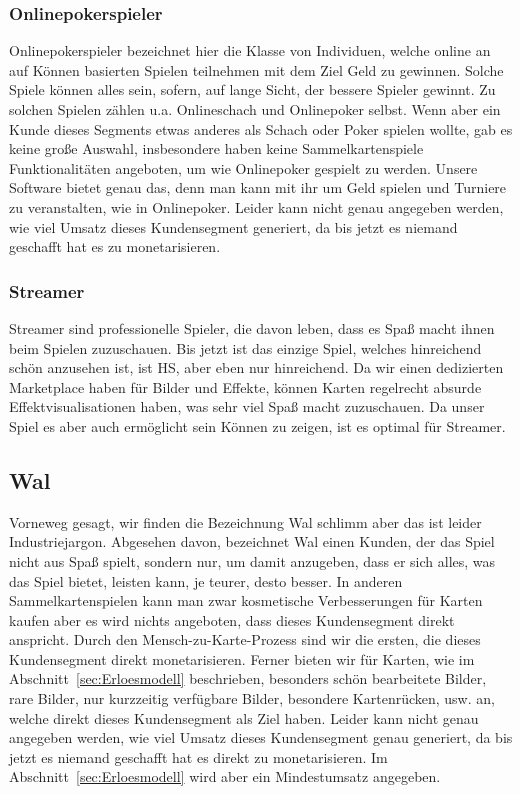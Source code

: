\documentclass[fontsize=12, a4aper]{scrartcl}
\begin{document}
\subsubsection{Onlinepokerspieler} \label{subsubsec:Professioneller_Spieler_Onlinepokerspieler}

Onlinepokerspieler bezeichnet hier die Klasse von Individuen, welche online an auf Können basierten Spielen teilnehmen mit dem Ziel Geld zu gewinnen. Solche Spiele können alles sein, sofern, auf lange Sicht, der bessere Spieler gewinnt. Zu solchen Spielen zählen u.a. Onlineschach und Onlinepoker selbst. Wenn aber ein Kunde dieses Segments etwas anderes als Schach oder Poker spielen wollte, gab es keine große Auswahl, insbesondere haben keine Sammelkartenspiele Funktionalitäten angeboten, um wie Onlinepoker gespielt zu werden. Unsere Software bietet genau das, denn man kann mit ihr um Geld spielen und Turniere zu veranstalten, wie in Onlinepoker. Leider kann nicht genau angegeben werden, wie viel Umsatz dieses Kundensegment generiert, da bis jetzt es niemand geschafft hat es zu monetarisieren.

\subsubsection{Streamer} \label{subsubsec:Professioneller Spieler_Streamer}

Streamer sind professionelle Spieler, die davon leben, dass es Spaß macht ihnen beim Spielen zuzuschauen. Bis jetzt ist das einzige Spiel, welches hinreichend schön anzusehen ist, ist \acl{HS}, aber eben nur hinreichend. Da wir einen dedizierten Marketplace haben für Bilder und Effekte, können Karten regelrecht absurde Effektvisualisationen haben, was sehr viel Spaß macht zuzuschauen. Da unser Spiel es aber auch ermöglicht sein Können zu zeigen, ist es optimal für Streamer.

\subsection{Wal} \label{subsec:Wal}

Vorneweg gesagt, wir finden die Bezeichnung \glqq Wal\grqq{} schlimm aber das ist leider Industriejargon. Abgesehen davon, bezeichnet \glqq Wal\grqq{} einen Kunden, der das Spiel nicht aus Spaß spielt, sondern nur, um damit anzugeben, dass er sich alles, was das Spiel bietet, leisten kann, je teurer, desto besser. In anderen Sammelkartenspielen kann man zwar kosmetische Verbesserungen für Karten kaufen aber es wird nichts angeboten, dass dieses Kundensegment direkt anspricht. Durch den \glqq Mensch-zu-Karte-Prozess\grqq{} sind wir die ersten, die dieses Kundensegment direkt monetarisieren. Ferner bieten wir für Karten, wie im Abschnitt~\ref{sec:Erloesmodell} beschrieben, besonders schön bearbeitete Bilder, rare Bilder, nur kurzzeitig verfügbare Bilder, besondere Kartenrücken, usw. an, welche direkt dieses Kundensegment als Ziel haben. Leider kann nicht genau angegeben werden, wie viel Umsatz dieses Kundensegment genau generiert, da bis jetzt es niemand geschafft hat es direkt zu monetarisieren. Im Abschnitt~\ref{sec:Erloesmodell} wird aber ein Mindestumsatz angegeben.
\end{document}
